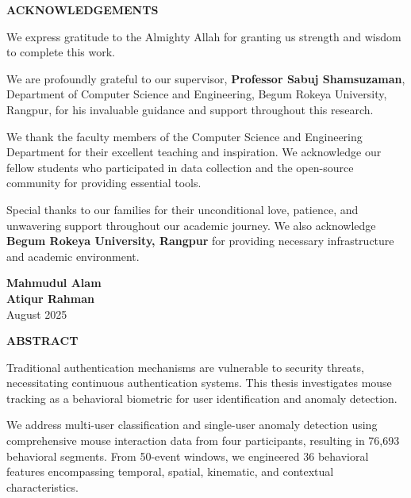 \documentclass[
  11pt,
  a4paper,
]{article}
\begin{document}
\newpage

\newpage
\thispagestyle{plain}

\begin{center}
\vspace*{2cm}
\textbf{\Large ACKNOWLEDGEMENTS}
\end{center}

\vspace*{2cm}

We express gratitude to the Almighty Allah for granting us strength and
wisdom to complete this work.

We are profoundly grateful to our supervisor,
\textbf{Professor Sabuj Shamsuzaman}, Department of Computer Science and
Engineering, Begum Rokeya University, Rangpur, for his invaluable
guidance and support throughout this research.

We thank the faculty members of the Computer Science and Engineering
Department for their excellent teaching and inspiration. We acknowledge
our fellow students who participated in data collection and the
open-source community for providing essential tools.

Special thanks to our families for their unconditional love, patience,
and unwavering support throughout our academic journey. We also
acknowledge \textbf{Begum Rokeya University, Rangpur} for providing
necessary infrastructure and academic environment.

\vspace*{2cm}

\begin{flushright}
\textbf{Mahmudul Alam}\\
\textbf{Atiqur Rahman}\\
August 2025
\end{flushright}

\newpage

\newpage
\thispagestyle{plain}

\begin{center}
\vspace*{2cm}
\textbf{\Large ABSTRACT}
\end{center}

\vspace*{2cm}

Traditional authentication mechanisms are vulnerable to security
threats, necessitating continuous authentication systems. This thesis
investigates mouse tracking as a behavioral biometric for user
identification and anomaly detection.

We address multi-user classification and single-user anomaly detection
using comprehensive mouse interaction data from four participants,
resulting in 76,693 behavioral segments. From 50-event windows, we
engineered 36 behavioral features encompassing temporal, spatial,
kinematic, and contextual characteristics.
\end{document}
